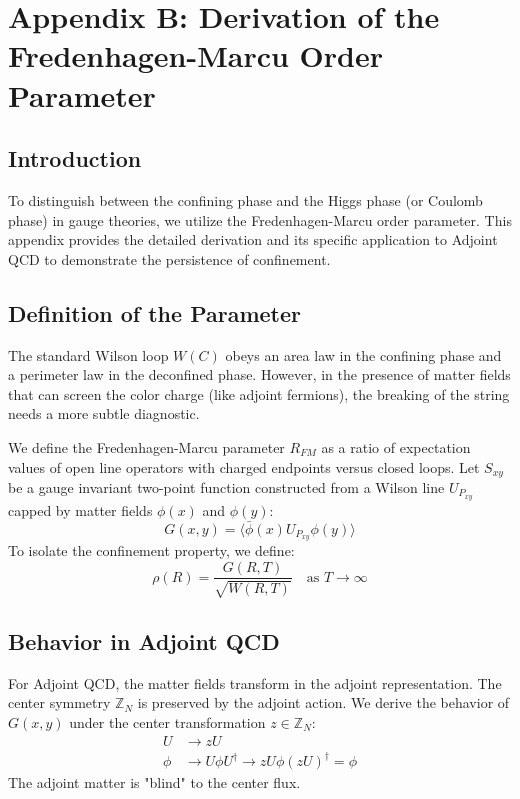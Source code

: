\chapter{Appendix B: Derivation of the Fredenhagen-Marcu Order Parameter}
\label{app:appendix_B_fredenhagen_marcu}

\section{Introduction}
To distinguish between the confining phase and the Higgs phase (or Coulomb phase) in gauge theories, we utilize the Fredenhagen-Marcu order parameter. This appendix provides the detailed derivation and its specific application to Adjoint QCD to demonstrate the persistence of confinement.

\section{Definition of the Parameter}
The standard Wilson loop $W(C)$ obeys an area law in the confining phase and a perimeter law in the deconfined phase. However, in the presence of matter fields that can screen the color charge (like adjoint fermions), the breaking of the string needs a more subtle diagnostic.

We define the Fredenhagen-Marcu parameter $R_{FM}$ as a ratio of expectation values of open line operators with charged endpoints versus closed loops.
Let $S_{xy}$ be a gauge invariant two-point function constructed from a Wilson line $U_{P_{xy}}$ capped by matter fields $\phi(x)$ and $\phi(y)$:
\begin{equation}
G(x, y) = \langle \bar{\phi}(x) U_{P_{xy}} \phi(y) \rangle
\end{equation}
To isolate the confinement property, we define:
\begin{equation}
\rho(R) = \frac{G(R, T)}{\sqrt{W(R, T)}} \quad \text{as } T \to \infty
\end{equation}

\section{Behavior in Adjoint QCD}
For Adjoint QCD, the matter fields transform in the adjoint representation. The center symmetry $\mathbb{Z}_N$ is preserved by the adjoint action.
We derive the behavior of $G(x, y)$ under the center transformation $z \in \mathbb{Z}_N$:
\begin{align}
U &\to z U \\
\phi &\to U \phi U^\dagger \to z U \phi (z U)^\dagger = \phi
\end{align}
The adjoint matter is "blind" to the center flux.

